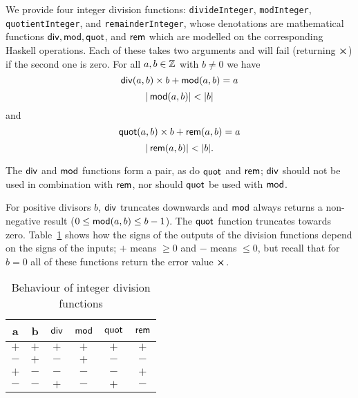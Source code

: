 
\label{note:integer-division-functions}
We provide four integer division functions: \texttt{divideInteger},
\texttt{modInteger}, \texttt{quotientInteger}, and \texttt{remainderInteger},
whose denotations are mathematical functions $\operatorname{\mathsf{div}}, \operatorname{\mathsf{mod}}, \operatorname{\mathsf{quot}}$, and
$\operatorname{\mathsf{rem}}$ which are modelled on the corresponding Haskell operations. Each of
these takes two arguments and will fail (returning $\errorX$) if the second one
is zero.  For all $a,b \in \mathbb{Z}$ with $b \ne 0$ we have
$$
\operatorname{\mathsf{div}}(a,b) \times b + \operatorname{\mathsf{mod}}(a,b) = a
$$
$$
  |\operatorname{\mathsf{mod}}(a,b)| < |b|
$$\noindent and
$$
  \operatorname{\mathsf{quot}}(a,b) \times b + \operatorname{\mathsf{rem}}(a,b) = a
$$
$$
  |\operatorname{\mathsf{rem}}(a,b)| < |b|.
$$

\noindent The $\operatorname{\mathsf{div}}$ and $\operatorname{\mathsf{mod}}$ functions form a pair, as do $\operatorname{\mathsf{quot}}$ and $\operatorname{\mathsf{rem}}$;
$\operatorname{\mathsf{div}}$ should not be used in combination with $\operatorname{\mathsf{rem}}$, nor should $\operatorname{\mathsf{quot}}$ be used
with $\operatorname{\mathsf{mod}}$.

For positive divisors $b$, $\operatorname{\mathsf{div}}$ truncates downwards and $\operatorname{\mathsf{mod}}$ always
returns a non-negative result ($0 \leq \operatorname{\mathsf{mod}}(a,b) \leq b-1$).  The $\operatorname{\mathsf{quot}}$
function truncates towards zero.  Table~\ref{table:integer-division-signs} shows
how the signs of the outputs of the division functions depend on the signs of
the inputs; $+$ means $\geq 0$ and $-$ means $\leq 0$, but recall that for $b=0$
all of these functions return the error value $\errorX$.
\begin{table}[H]
  \centering
    \begin{tabular}{|cc|cc|cc|}
        \hline
        a & b & $\operatorname{\mathsf{div}}$ & $\operatorname{\mathsf{mod}}$ & $\operatorname{\mathsf{quot}}$ & $\operatorname{\mathsf{rem}}$ \\
        \hline
        $+$ & $+$ & $+$ & $+$ & $+$ & $+$ \\
        $-$ & $+$ & $-$ & $+$ & $-$ & $-$ \\
        $+$ & $-$ & $-$ & $-$ & $-$ & $+$ \\
        $-$ & $-$ & $+$ & $-$ & $+$ & $-$ \\
        \hline
        \end{tabular}
   \caption{Behaviour of integer division functions}
   \label{table:integer-division-signs}
\end{table}

